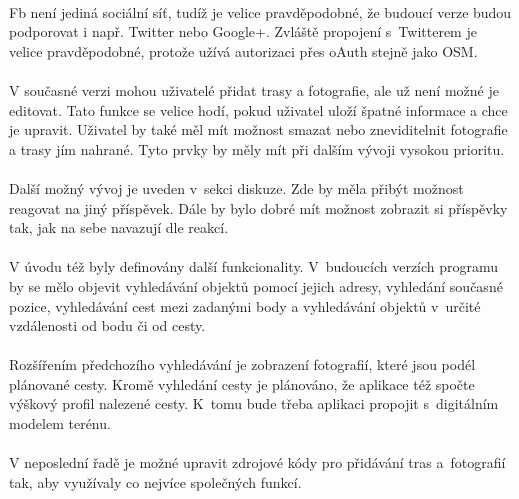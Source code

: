 \documentclass[11pt,a4paper,titlepage,oneside]{book}
\begin{document}
			\paragraph{}\ac{Fb} není jediná sociální síť, tudíž je velice pravděpodobné, že budoucí verze budou podporovat i např. Twitter nebo Google+. Zvláště propojení s~Twitterem je velice pravděpodobné, protože užívá autorizaci přes oAuth stejně jako \acl{OSM}.
			\paragraph{}V současné verzi mohou uživatelé přidat trasy a fotografie, ale už není možné je editovat. Tato funkce se velice hodí, pokud uživatel uloží špatné informace a chce je upravit. Uživatel by také měl mít možnost smazat nebo zneviditelnit fotografie a trasy jím nahrané. Tyto prvky by měly mít při dalším vývoji vysokou prioritu.
			\paragraph{}Další možný vývoj je uveden v~sekci diskuze. Zde by měla přibýt možnost reagovat na jiný příspěvek. Dále by bylo dobré mít možnost zobrazit si příspěvky tak, jak na sebe navazují dle reakcí.
			\paragraph{}V úvodu též byly definovány další funkcionality. V~budoucích verzích programu by se mělo objevit vyhledávání objektů pomocí jejich adresy, vyhledání současné pozice, vyhledávání cest mezi zadanými body a vyhledávání objektů v~určité vzdálenosti od bodu či od cesty. 
			\paragraph{}Rozšířením předchozího vyhledávání je zobrazení fotografií, které jsou podél plánované cesty. Kromě vyhledání cesty je plánováno, že aplikace též spočte výškový profil nalezené cesty. K~tomu bude třeba aplikaci propojit s~digitálním modelem terénu.
			\paragraph{}V neposlední řadě je možné upravit zdrojové kódy pro přidávání tras a~fotografií tak, aby využívaly co nejvíce společných funkcí.

\end{document}
